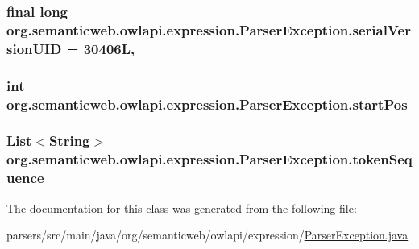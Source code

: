 \hypertarget{classorg_1_1semanticweb_1_1owlapi_1_1expression_1_1_parser_exception_a3af593cbc85db3ee83d6990c2e3e8ead}{
\subsubsection[{serial\-Version\-U\-I\-D}]{\setlength{\rightskip}{0pt plus 5cm}final long org.\-semanticweb.\-owlapi.\-expression.\-Parser\-Exception.\-serial\-Version\-U\-I\-D = 30406\-L\hspace{0.3cm}{\ttfamily [static]}, {\ttfamily [private]}}}\label{classorg_1_1semanticweb_1_1owlapi_1_1expression_1_1_parser_exception_a3af593cbc85db3ee83d6990c2e3e8ead}
\hypertarget{classorg_1_1semanticweb_1_1owlapi_1_1expression_1_1_parser_exception_abf9915df70aa9c722516081d133ddec0}{
\subsubsection[{start\-Pos}]{\setlength{\rightskip}{0pt plus 5cm}int org.\-semanticweb.\-owlapi.\-expression.\-Parser\-Exception.\-start\-Pos\hspace{0.3cm}{\ttfamily [private]}}}\label{classorg_1_1semanticweb_1_1owlapi_1_1expression_1_1_parser_exception_abf9915df70aa9c722516081d133ddec0}
\hypertarget{classorg_1_1semanticweb_1_1owlapi_1_1expression_1_1_parser_exception_a5d4c1095ba777f96929f108426a0f9be}{
\subsubsection[{token\-Sequence}]{\setlength{\rightskip}{0pt plus 5cm}List$<$String$>$ org.\-semanticweb.\-owlapi.\-expression.\-Parser\-Exception.\-token\-Sequence\hspace{0.3cm}{\ttfamily [private]}}}\label{classorg_1_1semanticweb_1_1owlapi_1_1expression_1_1_parser_exception_a5d4c1095ba777f96929f108426a0f9be}


The documentation for this class was generated from the following file\-:\begin{DoxyCompactItemize}
\item 
parsers/src/main/java/org/semanticweb/owlapi/expression/\hyperlink{_parser_exception_8java}{Parser\-Exception.\-java}\end{DoxyCompactItemize}
